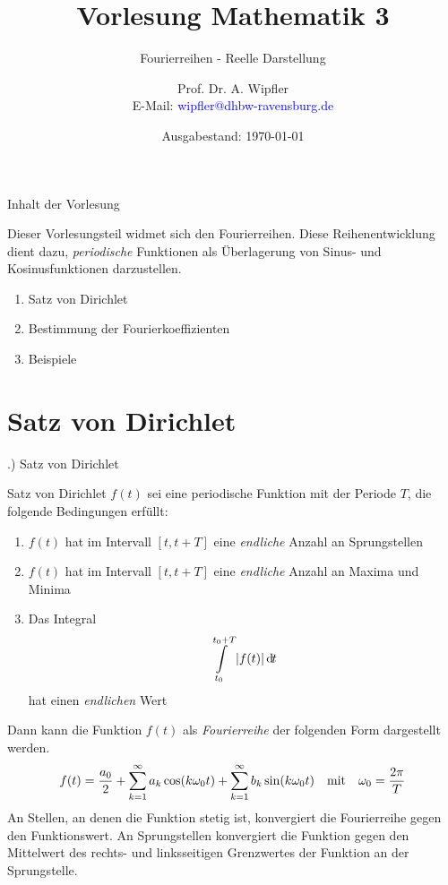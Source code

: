 \documentclass[t,14pt]{beamer}
\title[]{Vorlesung Mathematik 3}
\subtitle{Fourierreihen - Reelle Darstellung}
\author[]{Prof. Dr. A. Wipfler\\ E-Mail: \textcolor{blue}{wipfler@dhbw-ravensburg.de}}
\institute[]{{\footnotesize Duale Hochschule Baden-W\"urttemberg, Ravensburg/Friedrichshafen}}
\date[]{Ausgabestand: \today}
\newcommand*\diff{\mathop{}\!\mathrm{d\hspace{-1pt}}}	%
\newcommand{\mitm}{\quad\textnormal{mit}\quad}
\begin{document}
\begin{frame}
\titlepage
\end{frame}





\begin{frame}{Inhalt der Vorlesung}


Dieser Vorlesungsteil widmet sich den Fourierreihen. Diese Reihenentwicklung dient dazu, \emph{periodische} Funktionen als Überlagerung von Sinus- 
und Kosinusfunktionen darzustellen.
\begin{enumerate}
\item Satz von Dirichlet
\item Bestimmung der Fourierkoeffizienten
\item Beispiele
\end{enumerate}

\end{frame}

\section{Satz von Dirichlet}
\begin{frame}{\thesection .) Satz von Dirichlet}
\begin{alertblock}{Satz von Dirichlet}
$f(t)$ sei eine periodische Funktion mit der Periode $T$, die folgende Bedingungen erfüllt:
\begin{enumerate}
\item $f(t)$ hat im Intervall $[t,t+T]$ eine \emph{endliche} Anzahl an Sprungstellen
\item $f(t)$ hat im Intervall $[t,t+T]$ eine \emph{endliche} Anzahl an Maxima und Minima
\item Das Integral
\[
\intl_{t_0}^{t_0+T}|f(t)|\diff t 
\]
hat einen \emph{endlichen} Wert
\end{enumerate}
Dann kann die Funktion $f(t)$ als \emph{Fourierreihe} der folgenden Form dargestellt werden.
\[
f(t)=\frac{a_0}{2}+\suml_{k=1}^{\infty}a_k\cos(k\omega_0 t)+\suml_{k=1}^{\infty}b_k\sin(k\omega_0 t) \mitm \omega_0=\frac{2\pi}{T}
\]
An Stellen, an denen die Funktion stetig ist, konvergiert die Fourierreihe gegen den Funktionswert. An Sprungstellen konvergiert die Funktion 
gegen den Mittelwert des rechts- und linksseitigen Grenzwertes der Funktion an der Sprungstelle.
\end{alertblock}
\end{frame}
\end{document}
